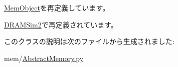 \hyperlink{classMemObject_1_1MemObject_acce15679d830831b0bbe8ebc2a60b2ca}{MemObject}を再定義しています。

\hyperlink{classDRAMSim2_1_1DRAMSim2_acce15679d830831b0bbe8ebc2a60b2ca}{DRAMSim2}で再定義されています。

このクラスの説明は次のファイルから生成されました:\begin{DoxyCompactItemize}
\item 
mem/\hyperlink{AbstractMemory_8py}{AbstractMemory.py}\end{DoxyCompactItemize}
